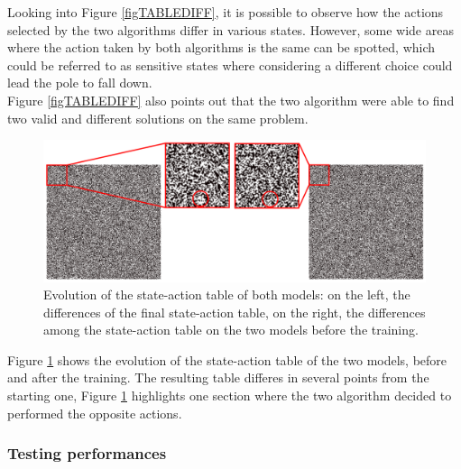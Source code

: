 Looking into Figure \ref{figTABLEDIFF}, it is possible to observe how the actions selected by the two algorithms differ in various states. However, some wide areas where the action taken by both algorithms is the same can be spotted, which could be referred to as sensitive states where considering a different choice could lead the pole to fall down.\\
Figure \ref{figTABLEDIFF} also points out that the two algorithm were able to find two valid and different solutions on the same problem.

\begin{figure}[H]
	\centering
	\includegraphics [width=\linewidth]{Images/diff_comparison.png}
	\caption{Evolution of the state-action table of both models: on the left, the differences of the final state-action table, on the right, the differences among the state-action table on the two models before the training.}
	\label{figDIFF_COMPARISON}
\end{figure}


Figure \ref{figDIFF_COMPARISON} shows the evolution of the state-action table of the two models, before and after the training. The resulting table differes in several points from the starting one, Figure \ref{figDIFF_COMPARISON} highlights one section where the two algorithm decided to performed the opposite actions. 

\subsubsection{Testing performances}

